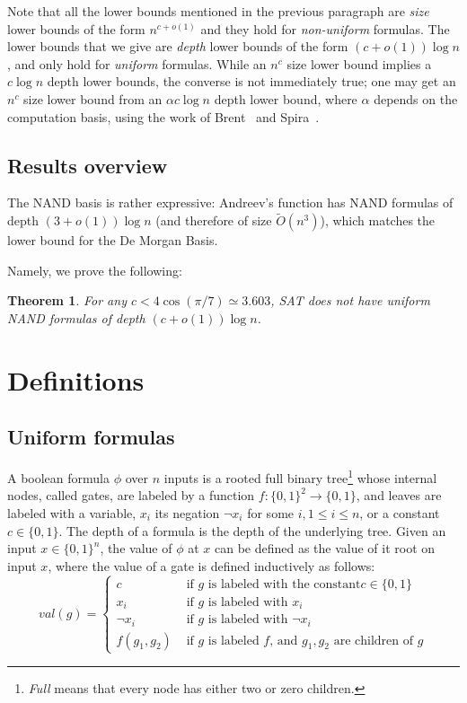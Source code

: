 \documentclass[a4paper, 11pt]{article}
\theoremstyle{plain}
\newtheorem{theorem}{Theorem}[section] %
\theoremstyle{definition}
\theoremstyle{remark}
\newcommand{\bit}{\{0,1\}}%
\newcommand{\Ot}[1]{\widetilde{O}\left( #1 \right)}%
\newcommand{\SAT}{\textsf{SAT}}%
\newcommand{\NAND}{\textsf{NAND}}%
\newcommand{\todoh}[1]{\todo[inline]{TODO: #1 }}%
\begin{document}
Note that all the lower bounds mentioned in the previous paragraph 
are \textit{size} lower bounds of the form $n^{c + o(1)}$
and they hold for \textit{non-uniform} formulas.  
The lower bounds that we give are \textit{depth} lower bounds of the form $(c + o(1))\log n$,
and only hold for \textit{uniform} formulas.
While an $n^c$ size lower bound implies a $c\log n$ depth lower bounds,
the converse is not immediately true; 
one may get an $n^c$ size lower bound from an
$\alpha c\log n$ depth lower bound, where $\alpha$ depends on the computation basis,
using the work of Brent~\cite{brent1974parallel} and Spira~\cite{spira1971time}.

\subsection{Results overview}

The \NAND{} basis is rather expressive: Andreev's function has \NAND{} formulas of depth $(3+o(1)) \log n$ (and therefore of size $\Ot{n^3}$), which matches the lower bound for the De Morgan Basis.
\todoh{more about nand?}

Namely, we prove the following:
\begin{theorem}\label{thm:main}
	For any $c < 4 \cos(\pi/7) \simeq 3.603$, \SAT{} does not have 
	uniform \NAND{} formulas of depth $(c + o(1)) \log n$.
\end{theorem}

\section{Definitions}

\subsection{Uniform formulas}
A boolean formula $\phi$ over $n$ inputs is a 
rooted full binary tree\footnote{\textit{Full} means that every node has either two or zero children.}
whose internal nodes, called gates, are labeled by a function $f: \bit^2 \rightarrow \bit$,
and leaves are labeled with a variable, $x_i$ its negation $\neg x_i$ for some $i, 1\le i \le n$,
or a constant $c\in\bit$.
The depth of a formula is the depth of the underlying tree.
Given an input $x \in\bit^n$, the value of $\phi$ at $x$ can be defined 
as the value of it root on input $x$, 
where the value of a gate is defined inductively as follows:
\[val(g) =\begin{cases}
	c & \text{ if $g$ is labeled with the constant} c\in\bit\\
	x_i & \text{ if $g$ is labeled with $x_i$}\\
	\neg x_i & \text{ if $g$ is labeled with $\neg x_i$}\\
	f(g_1, g_2) & \text{ if $g$ is labeled  $f$, and $g_1,g_2$ are children of $g$}
\end{cases}\]
\end{document}

